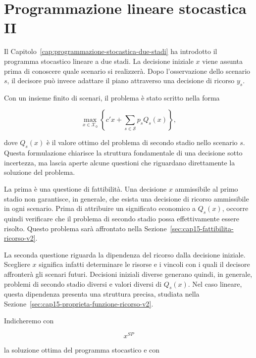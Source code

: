 
\chapter{Programmazione lineare stocastica II}

\label{cap:soluzione-valore-informazione-v2}

\medskip

Il Capitolo~\ref{cap:programmazione-stocastica-due-stadi} ha introdotto il
programma stocastico lineare a due stadi. La decisione iniziale $x$ viene
assunta prima di conoscere quale scenario si realizzer\`a. Dopo
l'osservazione dello scenario $s$, il decisore pu\`o invece adattare il piano
attraverso una decisione di ricorso $y_s$.

Con un insieme finito di scenari, il problema \`e stato scritto nella forma

\[
\max_{x\in\mathcal X_0}
\left\{
c'x+
\sum_{s\in\mathcal S}p_sQ_s(x)
\right\},
\]

\noindent dove $Q_s(x)$ \`e il valore ottimo del problema di secondo stadio nello
scenario $s$.
Questa formulazione chiarisce la struttura fondamentale di una decisione
sotto incertezza, ma lascia aperte alcune questioni che riguardano direttamente
la soluzione del problema.

La prima \`e una questione di fattibilit\`a. Una decisione $x$ ammissibile al
primo stadio non garantisce, in generale, che esista una decisione di ricorso
ammissibile in ogni scenario. Prima di attribuire un significato economico a
$Q_s(x)$, occorre quindi verificare che il problema di secondo stadio possa
effettivamente essere risolto. Questo problema sar\`a affrontato nella
Sezione~\ref{sec:cap15-fattibilita-ricorso-v2}.

La seconda questione riguarda la dipendenza del ricorso dalla decisione
iniziale. Scegliere $x$ significa infatti determinare le risorse e i vincoli
con i quali il decisore affronter\`a gli scenari futuri. Decisioni iniziali
diverse generano quindi, in generale, problemi di secondo stadio diversi e
valori diversi di $Q_s(x)$. Nel caso lineare, questa dipendenza presenta una
struttura precisa, studiata nella
Sezione~\ref{sec:cap15-proprieta-funzione-ricorso-v2}.

Indicheremo con

\[
x^{SP}
\]

\noindent la soluzione ottima del programma stocastico e con

